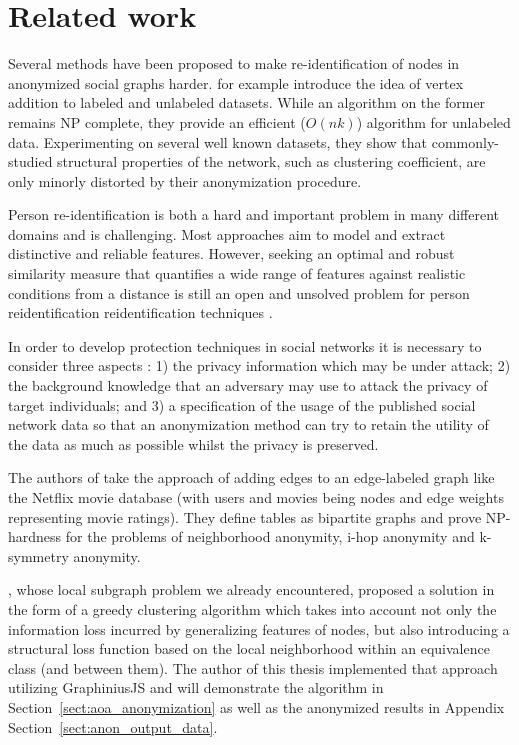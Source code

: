 \documentclass{llncs}
\begin{document}
\section{Related work}
\label{sect:related_work}


Several methods have been proposed to make re-identification of nodes in anonymized social graphs harder.	\cite{chester2011k} for example introduce the idea of vertex addition to labeled and unlabeled datasets. While an algorithm on the former remains NP complete, they provide an efficient ($O(nk)$) algorithm for unlabeled data. Experimenting on several well known datasets, they show that commonly-studied structural properties of the network, such as clustering coefficient, are only minorly distorted by their anonymization procedure.

Person re-identification is both a hard and important problem in many different domains and is challenging. Most approaches aim to model and extract distinctive and reliable features. However, seeking an optimal and robust similarity measure that quantifies a wide range of features against realistic conditions from a distance is still an open and unsolved problem for person reidentification  reidentification techniques \cite{Zheng:2013:reidentification}. 

In order to develop protection techniques in social networks it is necessary to consider three aspects \cite{Zhou:2008:SurveyAnonNetwork}: 1) the privacy information which may be
under attack; 2) the background knowledge that an adversary may use to attack the privacy
of target individuals; and 3) a specification of the usage of the published social network data so that an anonymization method can try to retain the utility of the data as much as possible whilst the privacy is preserved. 

The authors of \cite{kapron2011social} take the approach of adding edges to an edge-labeled graph like the Netflix movie database (with users and movies being nodes and edge weights representing movie ratings). They define tables as bipartite graphs and prove NP-hardness for the problems of neighborhood anonymity, i-hop anonymity and k-symmetry anonymity.

\cite{campan2009data}, whose local subgraph problem we already encountered, proposed a solution in the form of a greedy clustering algorithm which takes into account not only the information loss incurred by generalizing features of nodes, but also introducing a structural loss function based on the local neighborhood within an equivalence class (and between them). The author of this thesis implemented that approach utilizing GraphiniusJS and will demonstrate the algorithm in Section~\ref{sect:aoa_anonymization} as well as the anonymized results in Appendix Section~\ref{sect:anon_output_data}.
\end{document}
